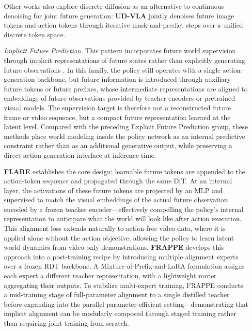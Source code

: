 Other works also explore discrete diffusion as an alternative to continuous denoising for joint future generation: \textbf{UD-VLA} \cite{udvla1} jointly denoises future image tokens and action tokens through iterative mask-and-predict steps over a unified discrete token space.



\textcolor{openmossblue}{\textit{Implicit Future Prediction.}}
This pattern incorporates future world supervision through implicit representations of future states rather than explicitly generating future observations \cite{FLARE, FRAPPE}. In this family, the policy still operates with a single action-generation backbone, but future information is introduced through auxiliary future tokens or future prefixes, whose intermediate representations are aligned to embeddings of future observations provided by teacher encoders or pretrained visual models. The supervision target is therefore not a reconstructed future frame or video sequence, but a compact future representation learned at the latent level. Compared with the preceding Explicit Future Prediction group, these methods place world modeling inside the policy network as an internal predictive constraint rather than as an additional generative output, while preserving a direct action-generation interface at inference time. 


\textbf{FLARE} \cite{FLARE} establishes the core design: learnable future tokens are appended to the action-token sequence and propagated through the same DiT. At an internal layer, the activations of these future tokens are projected by an MLP and supervised to match the visual embeddings of the actual future observation encoded by a frozen teacher encoder—effectively compelling the policy's internal representation to anticipate what the world will look like after action execution. This alignment loss extends naturally to action-free video data, where it is applied alone without the action objective, allowing the policy to learn latent world dynamics from video-only demonstrations.
\textbf{FRAPPE} \cite{FRAPPE} develops this approach into a post-training recipe by introducing multiple alignment experts over a frozen RDT backbone. A Mixture-of-Prefix-and-LoRA formulation assigns each expert a different teacher representation, with a lightweight router aggregating their outputs. To stabilize multi-expert training, FRAPPE conducts a mid-training stage of full-parameter alignment to a single distilled teacher before expanding into the parallel parameter-efficient setting—demonstrating that implicit alignment can be modularly composed through staged training rather than requiring joint training from scratch.





